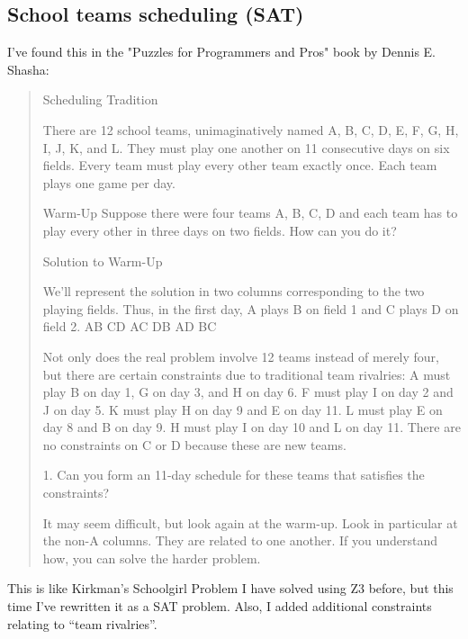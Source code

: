 \subsection{School teams scheduling (SAT)}

I've found this in the "Puzzles for Programmers and Pros" book by Dennis E. Shasha:

\begin{framed}
\begin{quotation}
Scheduling Tradition

There are 12 school teams, unimaginatively named A, B, C, D, E, F, G, H, I, J, K, and L. They must play one another on 11 consecutive days on six fields. 
Every team must play every other team exactly once. Each team plays one game per day.

        Warm-Up
                Suppose there were four teams A, B, C, D and each team has to play every other in three days on two fields. How can you do it?

        Solution to Warm-Up

                We’ll represent the solution in two columns corresponding to the two playing fields. Thus, in the first day, A plays B on field 1 and C plays D on field 2.
                AB CD
                AC DB
                AD BC

Not only does the real problem involve 12 teams instead of merely four, but there are certain constraints due to traditional team rivalries: 
A must play B on day 1, G on day 3, and H on day 6. F must play I on day 2 and J on day 5.  K must play H on day 9 and E on day 11. 
L must play E on day 8 and B on day 9. H must play I on day 10 and L on day 11. There are no constraints on C or D because these are new teams.

        1. Can you form an 11-day schedule for these teams that satisfies the constraints?

It may seem difficult, but look again at the warm-up. Look in particular at the non-A columns. They are related to one another.
If you understand how, you can solve the harder problem.
\end{quotation}
\end{framed}

This is like Kirkman's Schoolgirl Problem I have solved using Z3 before, but this time I've rewritten it as a SAT problem.
Also, I added additional constraints relating to ``team rivalries''.



